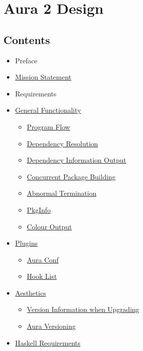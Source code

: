 \documentclass{article}
\begin{document}
\tableofcontents
\clearpage

\section{Aura 2 Design}\label{aura-2-design}

\subsection{Contents}\label{contents}

\begin{itemize}
\itemsep1pt\parskip0pt
\item
  Preface
\item
  \href{/DESIGN.md\#mission-statement}{Mission Statement}
\item
  Requirements
\item
  \href{/DESIGN.md\#general-functionality}{General Functionality}

  \begin{itemize}
  \itemsep1pt\parskip0pt
  \item
    \href{/DESIGN.md\#program-flow}{Program Flow}
  \item
    \href{/DESIGN.md\#dependency-resolution}{Dependency Resolution}
  \item
    \href{/DESIGN.md\#dependency-information-output}{Dependency
    Information Output}
  \item
    \href{/DESIGN.md\#concurrent-package-building}{Concurrent Package
    Building}
  \item
    \href{/DESIGN.md\#abnormal-termination}{Abnormal Termination}
  \item
    \href{/DESIGN.md\#pkginfo}{PkgInfo}
  \item
    \href{/DESIGN.md\#colour-output}{Colour Output}
  \end{itemize}
\item
  \href{/DESIGN.md\#plugins}{Plugins}

  \begin{itemize}
  \itemsep1pt\parskip0pt
  \item
    \href{/DESIGN.md\#auraconf}{Aura Conf}
  \item
    \href{/DESIGN.md\#hook-list}{Hook List}
  \end{itemize}
\item
  \href{/DESIGN.md\#aesthetics}{Aesthetics}

  \begin{itemize}
  \itemsep1pt\parskip0pt
  \item
    \href{/DESIGN.md\#version-information-when-upgrading}{Version
    Information when Upgrading}
  \item
    \href{/DESIGN.md\#aura-versioning}{Aura Versioning}
  \end{itemize}
\item
  \href{/DESIGN.md\#haskell-requirements}{Haskell Requirements}


\end{itemize}
\end{document}
